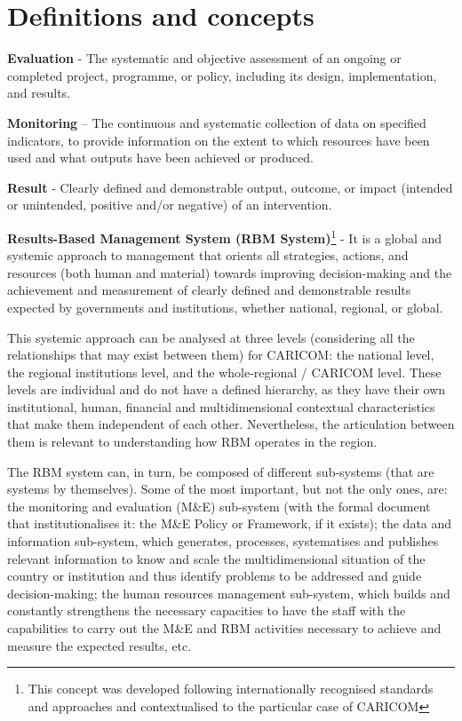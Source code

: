 \documentclass[
  10pt,
]{book}
\begin{document}
\hypertarget{definitions-and-concepts}{%
\chapter*{Definitions and concepts}\label{definitions-and-concepts}}

\textbf{Evaluation} - The systematic and objective assessment of an ongoing or completed project, programme, or policy, including its design, implementation, and results.

\textbf{Monitoring} -- The continuous and systematic collection of data on specified indicators, to provide information on the extent to which resources have been used and what outputs have been achieved or produced.

\textbf{Result} - Clearly defined and demonstrable output, outcome, or impact (intended or unintended, positive and/or negative) of an intervention.

\textbf{Results-Based Management System (RBM System)}\footnote{This concept was developed following internationally recognised standards and approaches and contextualised to the particular case of CARICOM} - It is a global and systemic approach to management that orients all strategies, actions, and resources (both human and material) towards improving decision-making and the achievement and measurement of clearly defined and demonstrable results expected by governments and institutions, whether national, regional, or global.

This systemic approach can be analysed at three levels (considering all the relationships that may exist between them) for CARICOM: the national level, the regional institutions level, and the whole-regional / CARICOM level. These levels are individual and do not have a defined hierarchy, as they have their own institutional, human, financial and multidimensional contextual characteristics that make them independent of each other. Nevertheless, the articulation between them is relevant to understanding how RBM operates in the region.

The RBM system can, in turn, be composed of different sub-systems (that are systems by themselves). Some of the most important, but not the only ones, are: the monitoring and evaluation (M\&E) sub-system (with the formal document that institutionalises it: the M\&E Policy or Framework, if it exists); the data and information sub-system, which generates, processes, systematises and publishes relevant information to know and scale the multidimensional situation of the country or institution and thus identify problems to be addressed and guide decision-making; the human resources management sub-system, which builds and constantly strengthens the necessary capacities to have the staff with the capabilities to carry out the M\&E and RBM activities necessary to achieve and measure the expected results, etc.
\end{document}

